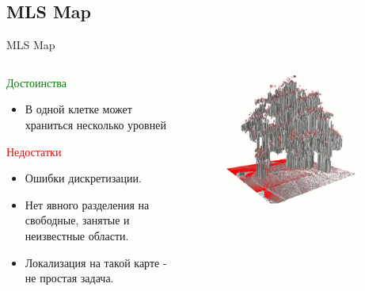 \documentclass[9pt]{beamer}
\begin{document}
\subsection{MLS Map}

\begin{frame}{MLS Map}
\begin{columns}
\begin{column}{0.50\textwidth}
  \begin{block}{\textcolor{green}{Достоинства}}
    \begin{itemize}
    \item
    { 
      В одной клетке может храниться несколько уровней
    }
    \end{itemize}
  \end{block}

  \begin{block}{\textcolor{red}{Недостатки}}
    \begin{itemize}
    \item
    {
      Ошибки дискретизации.
    }
    \item
    { 
      Нет явного разделения на свободные, занятые и неизвестные области.
    }
    \item
    {
      Локализация на такой карте - не простая задача.
    }
    \end{itemize}
  \end{block}
\end{column}
\begin{column}{0.50\textwidth}
    \begin{figure}[h]
      \centering
      \includegraphics[width=0.9\textwidth]{mls_tree.png}
    \end{figure}
\end{column}
\end{columns}
\end{frame}
\end{document}

